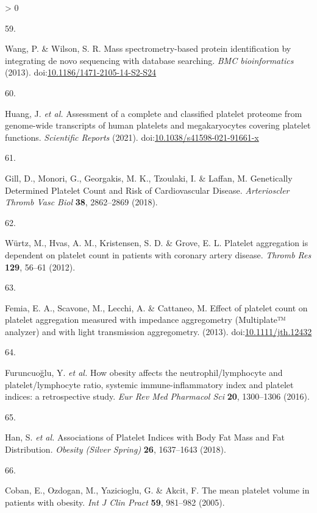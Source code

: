 \documentclass[11pt,twoside]{bristolthesis}
\newlength{\cslhangindent}
\newlength{\csllabelwidth}
\newenvironment{CSLReferences}[2] %
 {%
  \setlength{\parindent}{0pt}
  \ifodd #1 \everypar{\setlength{\hangindent}{\cslhangindent}}\ignorespaces\fi
  \ifnum #2 > 0
  \setlength{\parskip}{#2\baselineskip}
  \fi
 }%
 {}
\newcommand{\CSLLeftMargin}[1]{\parbox[t]{\csllabelwidth}{#1}}
\newcommand{\CSLRightInline}[1]{\parbox[t]{\linewidth - \csllabelwidth}{#1}\break}
\begin{document}
\begin{CSLReferences}{0}{0}
\leavevmode\hypertarget{ref-Wang2013}{}%
\CSLLeftMargin{59. }
\CSLRightInline{Wang, P. \& Wilson, S. R. {Mass spectrometry-based protein identification by integrating de novo sequencing with database searching.} \emph{BMC bioinformatics} (2013). doi:\href{https://doi.org/10.1186/1471-2105-14-S2-S24}{10.1186/1471-2105-14-S2-S24}}

\leavevmode\hypertarget{ref-Huang2021}{}%
\CSLLeftMargin{60. }
\CSLRightInline{Huang, J. \emph{et al.} {Assessment of a complete and classified platelet proteome from genome-wide transcripts of human platelets and megakaryocytes covering platelet functions}. \emph{Scientific Reports} (2021). doi:\href{https://doi.org/10.1038/s41598-021-91661-x}{10.1038/s41598-021-91661-x}}

\leavevmode\hypertarget{ref-Gill2018}{}%
\CSLLeftMargin{61. }
\CSLRightInline{Gill, D., Monori, G., Georgakis, M. K., Tzoulaki, I. \& Laffan, M. {Genetically Determined Platelet Count and Risk of Cardiovascular Disease}. \emph{Arterioscler Thromb Vasc Biol} \textbf{38}, 2862--2869 (2018).}

\leavevmode\hypertarget{ref-Wurtz2012}{}%
\CSLLeftMargin{62. }
\CSLRightInline{Würtz, M., Hvas, A. M., Kristensen, S. D. \& Grove, E. L. {Platelet aggregation is dependent on platelet count in patients with coronary artery disease}. \emph{Thromb Res} \textbf{129}, 56--61 (2012).}

\leavevmode\hypertarget{ref-Femia2013}{}%
\CSLLeftMargin{63. }
\CSLRightInline{Femia, E. A., Scavone, M., Lecchi, A. \& Cattaneo, M. {Effect of platelet count on platelet aggregation measured with impedance aggregometry (Multiplate™ analyzer) and with light transmission aggregometry}. (2013). doi:\href{https://doi.org/10.1111/jth.12432}{10.1111/jth.12432}}

\leavevmode\hypertarget{ref-Furuncuoglu2016}{}%
\CSLLeftMargin{64. }
\CSLRightInline{Furuncuoğlu, Y. \emph{et al.} {How obesity affects the neutrophil/lymphocyte and platelet/lymphocyte ratio, systemic immune-inflammatory index and platelet indices: a retrospective study}. \emph{Eur Rev Med Pharmacol Sci} \textbf{20}, 1300--1306 (2016).}

\leavevmode\hypertarget{ref-Han2018a}{}%
\CSLLeftMargin{65. }
\CSLRightInline{Han, S. \emph{et al.} {Associations of Platelet Indices with Body Fat Mass and Fat Distribution}. \emph{Obesity (Silver Spring)} \textbf{26}, 1637--1643 (2018).}

\leavevmode\hypertarget{ref-Coban2005}{}%
\CSLLeftMargin{66. }
\CSLRightInline{Coban, E., Ozdogan, M., Yazicioglu, G. \& Akcit, F. {The mean platelet volume in patients with obesity}. \emph{Int J Clin Pract} \textbf{59}, 981--982 (2005).}


\end{CSLReferences}
\end{document}
